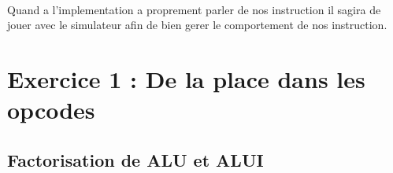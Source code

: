 \documentclass[12pt]{article}
\begin{document}
\paragraph{} Quand a l'implementation a proprement parler de nos instruction il
sagira de jouer avec le simulateur afin de bien gerer le comportement de nos instruction.

\newpage


\section{Exercice 1 : De la place dans les opcodes}
\subsection{Factorisation de ALU et ALUI}
\end{document}
